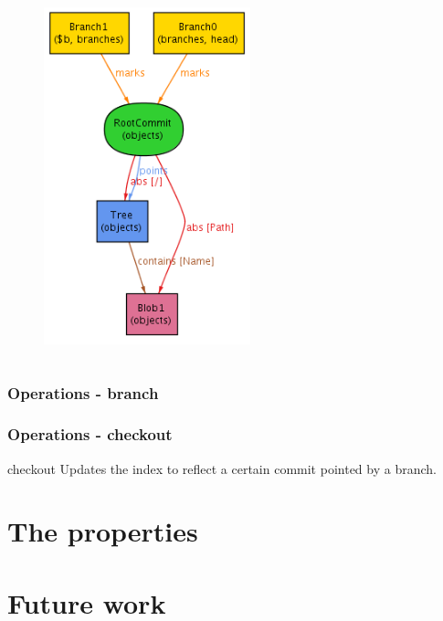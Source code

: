 \documentclass{beamer}
\begin{document}
\begin{frame}[fragile]
\begin{columns}[c]
\begin{figure}
         \includegraphics[width=0.90\textwidth]{images/branch2.png}
      \end{figure}
   \end{columns}
\end{frame}

\begin{frame}[fragile]
   \frametitle{Operations - branch}
\end{frame}

\begin{frame}[fragile]
   \frametitle{Operations - checkout}
   \begin{block}{checkout}
      Updates the index to reflect a certain commit pointed by a
      branch.
   \end{block}
\end{frame}

\section{The properties}
\section{Future work}

\frame{
   \titlepage
}
\end{document}
